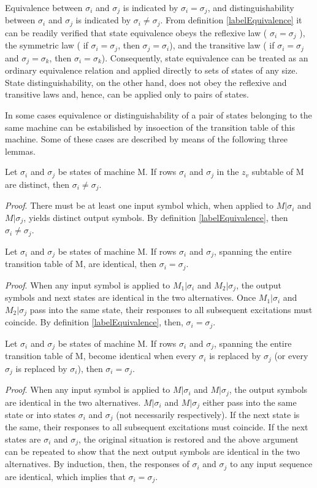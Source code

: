 \documentclass[a4paper]{report}
\begin{document}
    Equivalence between $\sigma_i$ and $\sigma_j$ is indicated by $\sigma_i = \sigma_j$, and distinguishability between $\sigma_i$ and $\sigma_j$ is indicated by  $\sigma_i \neq \sigma_j$. From definition \ref{labelEquivalence} it can be readily verified that state equivalence obeys the reflexive law ( $\sigma_i = \sigma_j$ ), the symmetric law ( if $\sigma_i = \sigma_j$, then $\sigma_j = \sigma_i$), and the transitive law  ( if $\sigma_i = \sigma_j$ and  $\sigma_j = \sigma_k$, then $\sigma_i = \sigma_k$). Consequently, state equivalence can be treated as an ordinary equivalence relation and applied directly to sets of states of any size. State distinguishability, on the other hand, does not obey the reflexive and transitive laws and, hence, can be applied only to pairs of states.

    In some cases equivalence or distinguishability of a pair of states belonging to the same machine can be estabilished by insoection of the transition table of this machine. Some of these cases are described by means of the following three lemmas. 


    \lemma Let $\sigma_i$ and $\sigma_j$ be states of machine M. If rows $\sigma_i$ and $\sigma_j$ in the $ z_v $ subtable of M are distinct, then $ \sigma_i \neq \sigma_j $.

    \emph{Proof}. There must be at least one input symbol which, when applied to $M|\sigma_i$ and $M|\sigma_j$, yields distinct output symbols. By definition \ref{labelEquivalence}, then $\sigma_i \neq \sigma_j$.


    \lemma Let $\sigma_i$ and $\sigma_j$ be states of machine M. If rows $\sigma_i$ and $\sigma_j$, spanning the entire transition table of M, are identical, then $\sigma_i = \sigma_j$.

    \emph{Proof}. When any input symbol is applied to $M_1|\sigma_i$ and $M_2|\sigma_j$, the output symbols and next states are identical in the two alternatives. Once $M_1|\sigma_i$ and $M_2|\sigma_j$ pass into the same state, their responses to all subsequent excitations must coincide. By definition \ref{labelEquivalence}, then, $\sigma_i = \sigma_j$.

    \lemma Let $\sigma_i$ and $\sigma_j$ be states of machine M. If rows $\sigma_i$ and $\sigma_j$, spanning the entire transition table of M, become identical when every $\sigma_i$ is replaced by $\sigma_j$ (or every $\sigma_j$ is replaced by $\sigma_i$), then $\sigma_i = \sigma_j$.

    \emph{Proof}. When any input symbol is applied to $M|\sigma_i$ and $M|\sigma_j$, the output symbols are identical in the two alternatives. $M|\sigma_i$ and $M|\sigma_j$ either pass into the same state or into states $\sigma_i$ and $\sigma_j$ (not necessarily respectively). If the next state is the same, their responses to all subsequent excitations must coincide. If the next states are $\sigma_i$ and $\sigma_j$, the original situation is restored and the above argument can be repeated to show that the next output symbols are identical in the two alternatives. By induction, then, the responses of $\sigma_i$ and $\sigma_j$ to any input sequence are identical, which implies that $\sigma_i = \sigma_j$.
\end{document}
